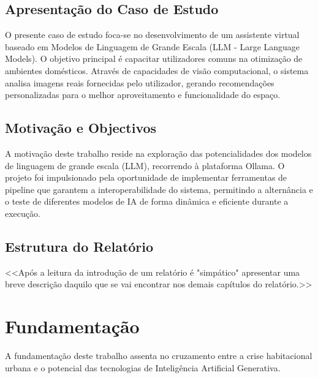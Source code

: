 \documentclass[a4paper,12pt]{scrreprt}
\begin{document}
    \section{Apresentação do Caso de Estudo}
        O presente caso de estudo foca-se no desenvolvimento de um assistente virtual baseado em Modelos de Linguagem de Grande Escala (LLM - Large Language Models). O objetivo principal é capacitar utilizadores comuns na otimização de ambientes domésticos. Através de capacidades de visão computacional, o sistema analisa imagens reais fornecidas pelo utilizador, gerando recomendações personalizadas para o melhor aproveitamento e funcionalidade do espaço.
    \section{Motivação e Objectivos}
        A motivação deste trabalho reside na exploração das potencialidades dos modelos de linguagem de grande escala (LLM), recorrendo à plataforma Ollama. O projeto foi impulsionado pela oportunidade de implementar ferramentas de pipeline que garantem a interoperabilidade do sistema, permitindo a alternância e o teste de diferentes modelos de IA de forma dinâmica e eficiente durante a execução.
    \section{Estrutura do Relatório}
        <<Após a leitura da introdução de um relatório é "simpático" apresentar uma breve descrição daquilo que se vai encontrar nos demais capítulos do relatório.>>



\chapter{Fundamentação}
    A fundamentação deste trabalho assenta no cruzamento entre a crise habitacional urbana e o potencial das tecnologias de Inteligência Artificial Generativa.
\end{document}
